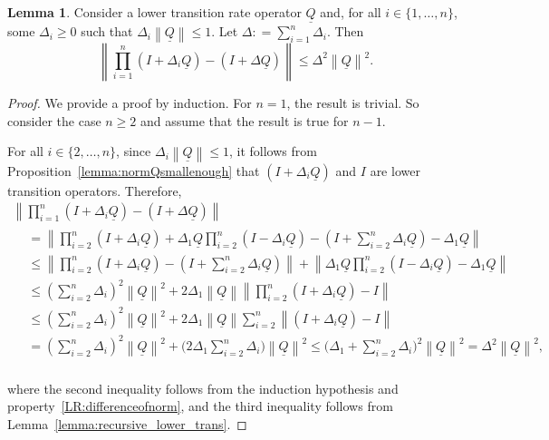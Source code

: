 \documentclass[10pt,a4paper]{paper}
\theoremstyle{definition}
\newtheorem{lemma}[theorem]{Lemma}
\newcommand{\lrate}{\underline{Q}}
\newcommand{\norm}[1]{\left\lVert #1 \right\rVert}
\newcommand{\coloneqq}{:\!=}
\begin{document}
\begin{lemma}\label{lemma:justthelinearpart}
Consider a lower transition rate operator $\lrate$ and, for all $i\in\{1,\ldots,n\}$, some $\Delta_i\geq0$ such that $\Delta_i\norm{\lrate}\leq1$. Let $\Delta\coloneqq\sum_{i=1}^n\Delta_i$. Then
\begin{equation*}
\norm{\prod_{i=1}^n(I+\Delta_i\lrate)-(I+\Delta\lrate)}\leq\Delta^2\norm{\lrate}^2.
\end{equation*}
\end{lemma}
\begin{proof}
We provide a proof by induction. For $n=1$, the result is trivial. So consider the case $n\geq2$ and assume that the result is true for $n-1$. 

For all $i\in\{2,\dots,n\}$, since $\Delta_i\norm{\lrate}\leq1$, it follows from Proposition~\ref{lemma:normQsmallenough} that $(I+\Delta_i\lrate)$ and $I$ are lower transition operators. Therefore,
\begin{multline*}
\norm{\prod_{i=1}^n(I+\Delta_i\lrate)-(I+\Delta\lrate)}\\
\begin{aligned}
&=\norm{\prod_{i=2}^n(I+\Delta_i\lrate)+\Delta_1\lrate\prod_{i=2}^n(I-\Delta_i\lrate)-(I+\sum_{i=2}^n\Delta_i\lrate)-\Delta_1\lrate}\\
&\leq\norm{\prod_{i=2}^n(I+\Delta_i\lrate)-(I+\sum_{i=2}^n\Delta_i\lrate)}+\norm{\Delta_1\lrate\prod_{i=2}^n(I-\Delta_i\lrate)-\Delta_1\lrate}\\
&\leq(\sum_{i=2}^n\Delta_i)^2\norm{\lrate}^2
+2\Delta_1\norm{\lrate}
\norm{\prod_{i=2}^n(I+\Delta_i\lrate)-I}\\
&\leq(\sum_{i=2}^n\Delta_i)^2\norm{\lrate}^2
+2\Delta_1\norm{\lrate}
\sum_{i=2}^n
\norm{(I+\Delta_i\lrate)-I}\\
&=(\sum_{i=2}^n\Delta_i)^2\norm{\lrate}^2
+\Big(2\Delta_1
\sum_{i=2}^n
\Delta_i\Big)\norm{\lrate}^2
\leq\Big(
\Delta_1+\sum_{i=2}^n\Delta_i
\Big)^2\norm{\lrate}^2
=\Delta^2\norm{\lrate}^2,
\end{aligned}
\end{multline*}\\[3pt]
where the second inequality follows from the induction hypothesis and property~\ref{LR:differenceofnorm}, and the third inequality follows from Lemma~\ref{lemma:recursive_lower_trans}.
\end{proof}
\end{document}
